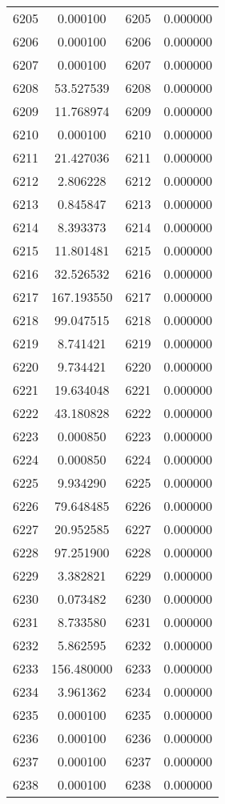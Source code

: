 \documentclass[12pt]{article}
\begin{document}
\begin{longtable}{@{}cccc@{}}
6205 & 0.000100 & 6205 & 0.000000 \\
6206 & 0.000100 & 6206 & 0.000000 \\
6207 & 0.000100 & 6207 & 0.000000 \\
6208 & 53.527539 & 6208 & 0.000000 \\
6209 & 11.768974 & 6209 & 0.000000 \\
6210 & 0.000100 & 6210 & 0.000000 \\
6211 & 21.427036 & 6211 & 0.000000 \\
6212 & 2.806228 & 6212 & 0.000000 \\
6213 & 0.845847 & 6213 & 0.000000 \\
6214 & 8.393373 & 6214 & 0.000000 \\
6215 & 11.801481 & 6215 & 0.000000 \\
6216 & 32.526532 & 6216 & 0.000000 \\
6217 & 167.193550 & 6217 & 0.000000 \\
6218 & 99.047515 & 6218 & 0.000000 \\
6219 & 8.741421 & 6219 & 0.000000 \\
6220 & 9.734421 & 6220 & 0.000000 \\
6221 & 19.634048 & 6221 & 0.000000 \\
6222 & 43.180828 & 6222 & 0.000000 \\
6223 & 0.000850 & 6223 & 0.000000 \\
6224 & 0.000850 & 6224 & 0.000000 \\
6225 & 9.934290 & 6225 & 0.000000 \\
6226 & 79.648485 & 6226 & 0.000000 \\
6227 & 20.952585 & 6227 & 0.000000 \\
6228 & 97.251900 & 6228 & 0.000000 \\
6229 & 3.382821 & 6229 & 0.000000 \\
6230 & 0.073482 & 6230 & 0.000000 \\
6231 & 8.733580 & 6231 & 0.000000 \\
6232 & 5.862595 & 6232 & 0.000000 \\
6233 & 156.480000 & 6233 & 0.000000 \\
6234 & 3.961362 & 6234 & 0.000000 \\
6235 & 0.000100 & 6235 & 0.000000 \\
6236 & 0.000100 & 6236 & 0.000000 \\
6237 & 0.000100 & 6237 & 0.000000 \\
6238 & 0.000100 & 6238 & 0.000000 \\

\end{longtable}
\end{document}
